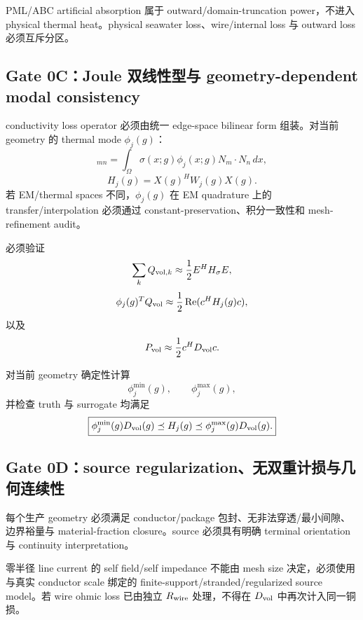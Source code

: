 PML/ABC artificial absorption 属于 outward/domain-truncation power，不进入 physical thermal heat。physical seawater loss、wire/internal loss 与 outward loss 必须互斥分区。

\subsection{Gate 0C：Joule 双线性型与 geometry-dependent modal consistency}
conductivity loss operator 必须由统一 edge-space bilinear form 组装。对当前 geometry 的 thermal mode $\phi_j(g)$：
\begin{equation}
[W_j(g)]_{mn}
=\int_\Omega\sigma(x;g)\phi_j(x;g)N_m\cdot N_n\,dx,
\end{equation}
\begin{equation}
H_j(g)=X(g)^HW_j(g)X(g).
\end{equation}
若 EM/thermal spaces 不同，$\phi_j(g)$ 在 EM quadrature 上的 transfer/interpolation 必须通过 constant-preservation、积分一致性和 mesh-refinement audit。

必须验证
\begin{equation}
\sum_kQ_{{\rm vol},k}
\approx\frac12E^HH_\sigma E,
\end{equation}
\begin{equation}
\phi_j(g)^TQ_{\rm vol}
\approx\frac12\operatorname{Re}(c^HH_j(g)c),
\end{equation}
以及
\begin{equation}
P_{\rm vol}\approx\frac12c^HD_{\rm vol}c.
\end{equation}

对当前 geometry 确定性计算
\begin{equation}
\phi_j^{\min}(g),\qquad\phi_j^{\max}(g),
\end{equation}
并检查 truth 与 surrogate 均满足
\begin{equation}
\boxed{
\phi_j^{\min}(g)D_{\rm vol}(g)
\preceq H_j(g)
\preceq\phi_j^{\max}(g)D_{\rm vol}(g).
}
\end{equation}

\subsection{Gate 0D：source regularization、无双重计损与几何连续性}
每个生产 geometry 必须满足 conductor/package 包封、无非法穿透/最小间隙、边界裕量与 material-fraction closure。source 必须具有明确 terminal orientation 与 continuity interpretation。

零半径 line current 的 self field/self impedance 不能由 mesh size 决定，必须使用与真实 conductor scale 绑定的 finite-support/stranded/regularized source model。若 wire ohmic loss 已由独立 $R_{\rm wire}$ 处理，不得在 $D_{\rm vol}$ 中再次计入同一铜损。

